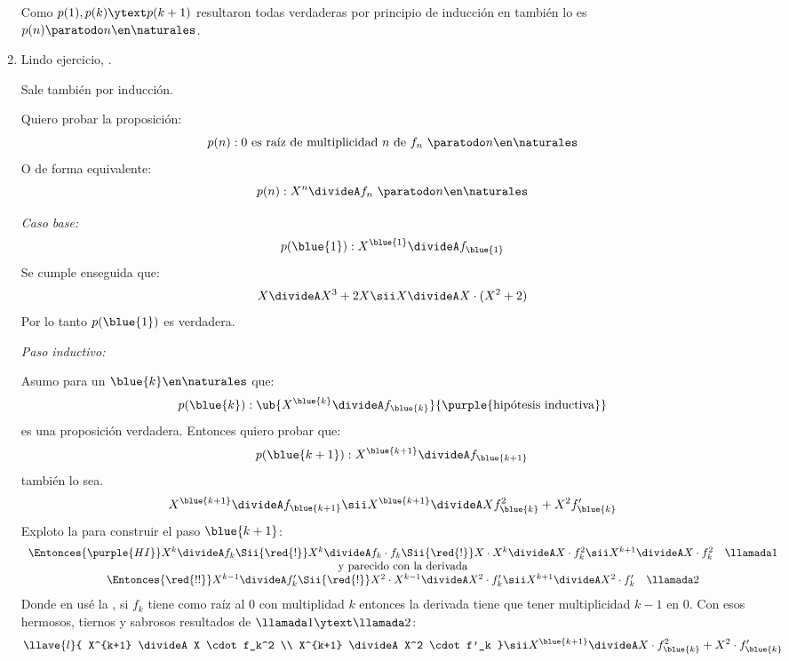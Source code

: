 \begin{enumerate}[label=\roman*)]
	      Como $p(1), p(k) \ytext p(k+1)$ resultaron todas verdaderas por principio de inducción en también lo es $p(n) \paratodo n \en \naturales$.

	\item Lindo ejercicio, .

	      Sale también por inducción.


	      Quiero probar la proposición:
	      $$
		      p(n) : \text{0 es raíz de multiplicidad $n$ de $f_n \ \paratodo n \en \naturales$}
	      $$
	      O de forma equivalente:
	      $$
		      p(n) :  X^n \divideA f_n \ \paratodo n \en \naturales
	      $$

	      \textit{Caso base:}
	      $$
		      p(\blue{1}) : X^{\blue{1}} \divideA f_{\blue{1}}
	      $$
	      Se cumple enseguida que:
	      $$
		      X \divideA X^3 + 2X
		      \sii
		      X \divideA X \cdot (X^2 + 2)
	      $$
	      Por lo tanto $p(\blue{1})$ es verdadera.

	      \textit{Paso inductivo:}

	      Asumo para un $\blue{k} \en \naturales$ que:
	      $$
		      p(\blue{k}) : \ub{
			      X^{\blue{k}} \divideA f_{\blue{k}}
		      }{
			      \text{\purple{hipótesis inductiva}}
		      }
	      $$
	      es una proposición verdadera. Entonces quiero probar que:
	      $$
		      p(\blue{k + 1}) : X^{\blue{k+1}} \divideA f_{\blue{k+1}}
	      $$
	      también lo sea.
	      $$
		      X^{\blue{k+1}} \divideA f_{\blue{k+1}}
		      \sii
		      X^{\blue{k+1}} \divideA Xf_{\blue{k}}^2 + X^2f'_{\blue{k}}
	      $$
	      Exploto la  para construir el paso $\blue{k+1}$:
	      $$
		      \begin{array}{c}
			      \Entonces{\purple{HI}}
			      X^k \divideA f_k
			      \Sii{\red{!}}
			      X^k \divideA f_k \cdot f_k
			      \Sii{\red{!}}
			      X \cdot X^k \divideA X\cdot f_k^2
			      \sii
			      X^{k+1} \divideA X \cdot f_k^2  \quad \llamada1 \\
			      \text{y parecido con la derivada}               \\
			      \Entonces{\red{!!}}	      X^{k-1} \divideA f'_k
			      \Sii{\red{!}}
			      X^2 \cdot X^{k-1} \divideA X^2 \cdot f'_k
			      \sii
			      X^{k+1} \divideA X^2 \cdot f'_k \quad \llamada2
		      \end{array}
	      $$
	      Donde en \red{!!} usé la , si $f_k$ tiene como raíz al 0 con multiplidad $k$ entonces la derivada tiene que
	      tener multiplicidad $k-1$ en 0.
	      Con esos hermosos, tiernos y sabrosos resultados de $\llamada1 \ytext \llamada2$:
	      $$
		      \llave{l}{
			      X^{k+1} \divideA X \cdot f_k^2  \\
			      X^{k+1} \divideA X^2 \cdot f'_k
		      }
		      \sii
		      X^{\blue{k+1}} \divideA X \cdot f_{\blue{k}}^2 +  X^2 \cdot f'_{\blue{k}} \\
	      $$


\end{enumerate}

